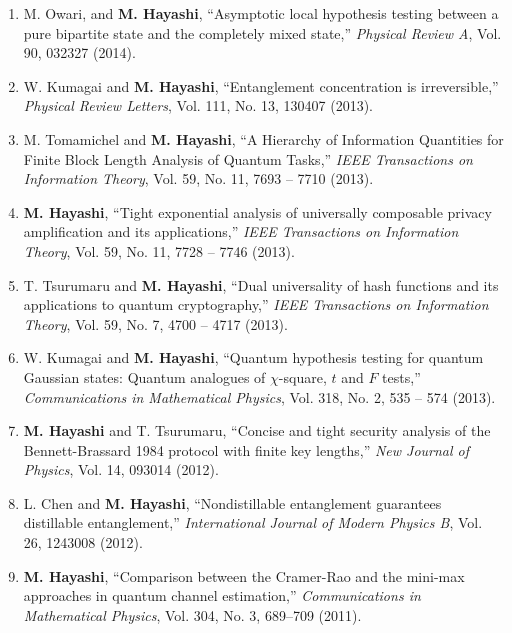 \documentclass[a4paper,12pt,oneside]{article}
\begin{document}
\begin{enumerate}
\item 
M. Owari, and \textbf{M. Hayashi},
``Asymptotic local hypothesis testing between a pure bipartite state and the
completely mixed state,''
{\em Physical Review A}, Vol. 90, 032327 (2014).

\item W. Kumagai and \textbf{M. Hayashi}, 
``Entanglement concentration is irreversible,''
{\em Physical Review Letters}, Vol. 111, No. 13, 130407 (2013).

\item M. Tomamichel and \textbf{M. Hayashi}, 
``A Hierarchy of Information Quantities for Finite Block Length Analysis of Quantum Tasks,''
{\em IEEE Transactions on Information Theory},
 Vol. 59,  No. 11, 7693 -- 7710 (2013).

\item 
\textbf{M. Hayashi}, 
``Tight exponential analysis of universally composable privacy amplification and its applications,''
{\em IEEE Transactions on Information Theory},
 Vol. 59,  No. 11, 7728 -- 7746 (2013).

\item T. Tsurumaru and \textbf{M. Hayashi}, 
``Dual universality of hash functions and its applications to quantum cryptography,''
{\em IEEE Transactions on Information Theory},
Vol. 59, No. 7, 4700 -- 4717 (2013). 

\item W. Kumagai and \textbf{M. Hayashi}, 
``Quantum hypothesis testing for quantum Gaussian states: Quantum analogues of $\chi$-square, $t$ and $F$ tests,''  {\em Communications in Mathematical Physics}, Vol. 318, No. 2, 535 -- 574 (2013). 

\item \textbf{M. Hayashi} and T. Tsurumaru, 
``Concise and tight security analysis of the Bennett-Brassard 1984 protocol with finite key lengths,'' 
{\em New Journal of Physics}, Vol. 14, 093014 (2012).

\item L. Chen and \textbf{M. Hayashi}, 
``Nondistillable entanglement guarantees distillable entanglement,''
{\em International Journal of Modern Physics B}, Vol. 26, 1243008 (2012).

\item \textbf{M. Hayashi}, 
``Comparison between the Cramer-Rao and the mini-max approaches in quantum channel estimation,'' 
{\em Communications in Mathematical Physics}, Vol. 304, No. 3, 689--709 (2011).


\end{enumerate}
\end{document}

